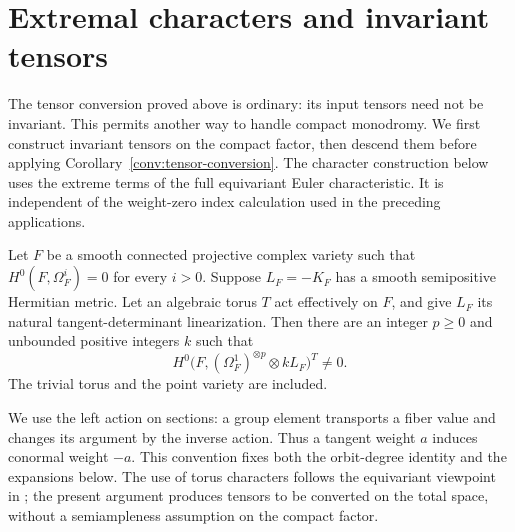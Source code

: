 \section{Extremal characters and invariant tensors}
\label{ext:section}

The tensor conversion proved above is ordinary: its input tensors need
not be invariant.  This permits another way to handle compact
monodromy.  We first construct invariant tensors on the compact factor,
then descend them before applying Corollary~\ref{conv:tensor-conversion}.
The character construction below uses the extreme terms of the full
equivariant Euler characteristic.  It is independent of the
weight-zero index calculation used in the preceding applications.

\begin{proposition}\label{ext:invariant-tensors}
Let $F$ be a smooth connected projective complex variety such that
$H^0(F,\Omega_F^i)=0$ for every $i>0$.  Suppose $L_F=-K_F$ has a
smooth semipositive Hermitian metric.  Let an algebraic torus $T$ act
effectively on $F$, and give $L_F$ its natural tangent-determinant
linearization.  Then there are an integer $p\geq0$ and unbounded
positive integers $k$ such that
\[
 H^0\bigl(F,(\Omega_F^1)^{\otimes p}\otimes kL_F\bigr)^T\ne0.
\]
The trivial torus and the point variety are included.
\end{proposition}

We use the left action on sections: a group element transports a
fiber value and changes its argument by the inverse action.  Thus a
tangent weight $a$ induces conormal weight $-a$.  This convention
fixes both the orbit-degree identity and the expansions below.  The
use of torus characters follows the equivariant viewpoint in
\cite{Muller2025}; the present argument produces tensors to be
converted on the total space, without a semiampleness assumption on
the compact factor.

